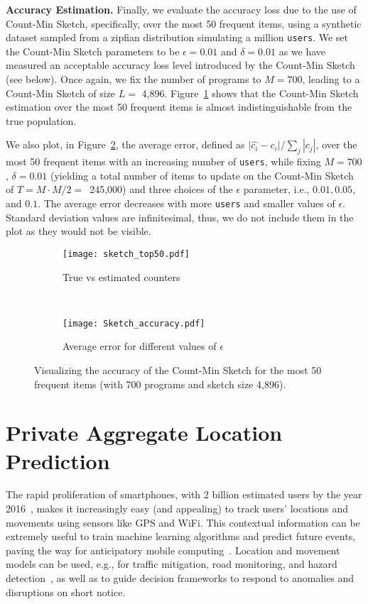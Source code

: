 \documentclass[conference]{IEEEtran}
\newcommand{\descr}[1]{\medskip \noindent \textbf{#1}}
\newcommand{\users}{{\tt users}\xspace}
\begin{document}
\descr{Accuracy Estimation.} Finally, we evaluate the accuracy loss due to the use of Count-Min Sketch, specifically, over the most 50 frequent items,
using a synthetic dataset sampled from a zipfian distribution simulating a million \users.
We set the Count-Min Sketch parameters to be $\epsilon = 0.01$ and $\delta = 0.01$ as we have measured an acceptable accuracy loss level introduced by the Count-Min Sketch (see below). Once again, we fix the number of programs to $M=\text{700}$, leading to a Count-Min Sketch of size $L =$ 4,896.
Figure~\ref{fig:top50} shows that the Count-Min Sketch estimation over the most 50 frequent items is almost indistinguishable from the true population.

We also plot, in Figure~\ref{fig:sketch-accuracy}, the average error, defined as
$\vert \hat{c_i} - c_i \vert/\sum_{j} |c_j|$,
over the most 50 frequent items with an increasing number of \users, while  fixing $M=\text{700}$, $\delta = 0.01$ (yielding a total number of items to update on the Count-Min Sketch of $T=M\cdot M/2=$~245,000) and three choices  of the $\epsilon$ parameter, i.e., $0.01,0.05$, and $0.1$.
The average error decreases with more \users and smaller values of $\epsilon$. Standard deviation values are infinitesimal, thus, we do not include them in the plot as they would not be visible.



\begin{figure*}[t]
\centering
    \begin{subfigure}[t]{0.4\textwidth}
        \centering
		\texttt{[image: sketch\_top50.pdf]}
        \caption{\label{fig:top50} True vs estimated counters}
    \end{subfigure} 
~
    \begin{subfigure}[t]{0.4\textwidth}
        \centering
		\texttt{[image: Sketch\_accuracy.pdf]}
        \caption{\label{fig:sketch-accuracy} Average error for different values of $\epsilon$}
    \end{subfigure}\vspace{-0.3cm}
\caption{\label{fig:figs} Visualizing the accuracy of the Count-Min Sketch for the most 50 frequent items (with 700 programs and sketch size 4,896).}
    \vspace{-0.3cm}
\end{figure*}


\section{Private Aggregate Location Prediction }
\label{sec:smartphone}
The rapid proliferation of smartphones, with 2 billion estimated users by the year 2016~\cite{telegraph}, makes it increasingly easy (and appealing) to track users' locations and movements using sensors like GPS and WiFi.
This contextual information can be extremely useful to train machine learning algorithms and predict future events, paving the way for anticipatory mobile computing~\cite{pejovic2013anticipatory}.
Location and movement models can be used, e.g., for traffic mitigation, road  monitoring, and hazard detection~\cite{cartel}, as well as to guide decision frameworks to respond to anomalies and disruptions on short notice.
\end{document}
